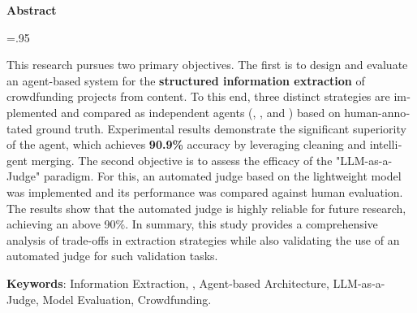 

\begin{latin}

\begin{center}
\textbf{Abstract}
\end{center}
\baselineskip=.95\baselineskip

This research pursues two primary objectives. The first is to design and evaluate an agent-based system for the \textbf{structured information extraction} of crowdfunding projects from  content. To this end, three distinct strategies are implemented and compared as independent agents (, , and ) based on human-annotated ground truth. Experimental results demonstrate the significant superiority of the  agent, which achieves \textbf{90.9\%} accuracy by leveraging  cleaning and intelligent merging. The second objective is to assess the efficacy of the "LLM-as-a-Judge" paradigm. For this, an automated judge based on the lightweight  model was implemented and its performance was compared against human evaluation. The results show that the automated judge is highly reliable for future research, achieving an  above 90\%. In summary, this study provides a comprehensive analysis of trade-offs in extraction strategies while also validating the use of an automated judge for such validation tasks.

\bigskip\noindent\textbf{Keywords}: Information Extraction, , Agent-based Architecture, LLM-as-a-Judge, Model Evaluation, Crowdfunding.

\end{latin}
